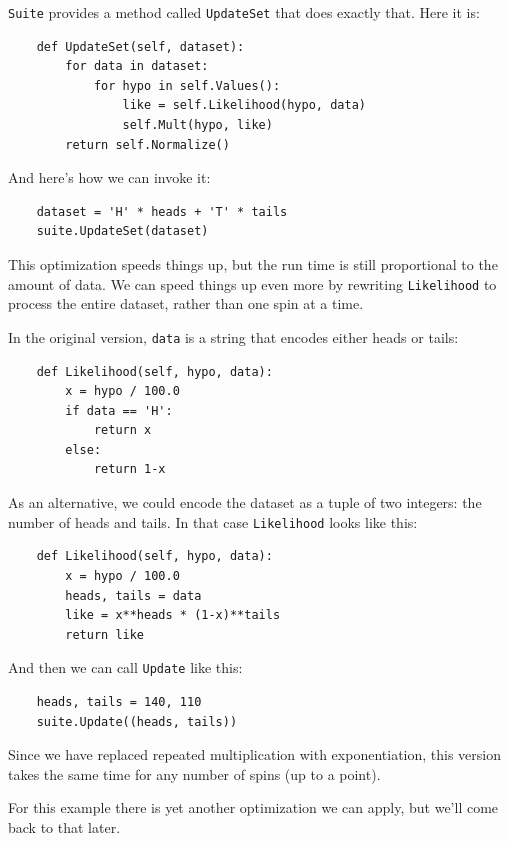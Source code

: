 \documentclass[12pt]{book}
\begin{document}
\verb"Suite" provides a method called \verb"UpdateSet" that does
exactly that.  Here it is:

\begin{verbatim}
    def UpdateSet(self, dataset):
        for data in dataset:
            for hypo in self.Values():
                like = self.Likelihood(hypo, data)
                self.Mult(hypo, like)
        return self.Normalize()
\end{verbatim}

And here's how we can invoke it:

\begin{verbatim}
    dataset = 'H' * heads + 'T' * tails
    suite.UpdateSet(dataset)
\end{verbatim}

This optimization speeds things up, but the run time is still
proportional to the amount of data.  We can speed things up
even more by rewriting \verb"Likelihood" to process the entire
dataset, rather than one spin at a time.

In the original version,
\verb"data" is a string that encodes either heads or tails:

\begin{verbatim}
    def Likelihood(self, hypo, data):
        x = hypo / 100.0
        if data == 'H':
            return x
        else:
            return 1-x
\end{verbatim}

As an alternative, we could encode the dataset as a tuple of 
two integers: the number of heads and tails.
In that case \verb"Likelihood" looks like this:

\begin{verbatim}
    def Likelihood(self, hypo, data):
        x = hypo / 100.0
        heads, tails = data
        like = x**heads * (1-x)**tails
        return like
\end{verbatim}

And then we can call \verb"Update" like this:

\begin{verbatim}
    heads, tails = 140, 110
    suite.Update((heads, tails))
\end{verbatim}

Since we have replaced repeated multiplication with exponentiation,
this version takes the same time for any number of spins (up
to a point).

For this example there is yet another optimization we can apply,
but we'll come back to that later.
\end{document}

